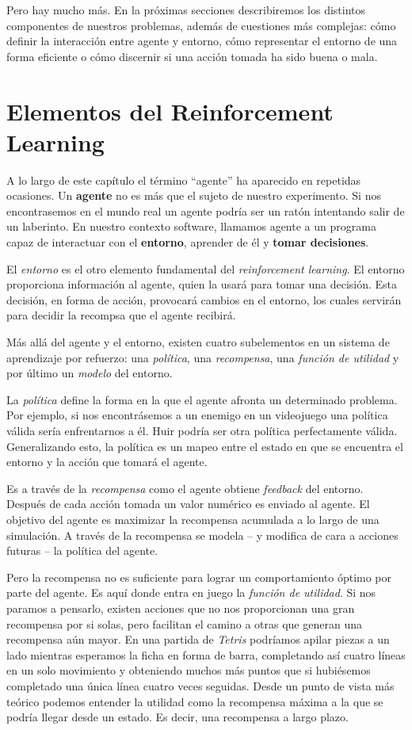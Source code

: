 Pero hay mucho más. En la próximas secciones describiremos los distintos componentes de nuestros problemas, además de cuestiones más complejas: cómo definir la interacción entre agente y entorno, cómo representar el entorno de una forma eficiente o cómo discernir si una acción tomada ha sido buena o mala.

\section{Elementos del Reinforcement Learning}
A lo largo de este capítulo el término ``agente'' ha aparecido en repetidas ocasiones. Un \textbf{agente} no es más que el sujeto de nuestro experimento. Si nos encontrasemos en el mundo real un agente podría ser un ratón intentando salir de un laberinto. En nuestro contexto software, llamamos agente a un programa capaz de interactuar con el \textbf{entorno}, aprender de él y \textbf{tomar decisiones}.

El \textit{entorno} es el otro elemento fundamental del \textit{reinforcement learning}. El entorno proporciona información al agente, quien la usará para tomar una decisión. Esta decisión, en forma de acción, provocará cambios en el entorno, los cuales servirán para decidir la recompsa que el agente recibirá.

Más allá del agente y el entorno, existen cuatro subelementos en un sistema de aprendizaje por refuerzo: una \textit{política}, una \textit{recompensa}, una \textit{función de utilidad} y por último un \textit{modelo} del entorno.

La \textit{política} define la forma en la que el agente afronta un determinado problema. Por ejemplo, si nos encontrásemos a un enemigo en un videojuego una política válida sería enfrentarnos a él. Huir podría ser otra política perfectamente válida. Generalizando esto, la política es un mapeo entre el estado en que se encuentra el entorno y la acción que tomará el agente.

Es a través de la \textit{recompensa} como el agente obtiene \textit{feedback} del entorno. Después de cada acción tomada un valor numérico es enviado al agente. El objetivo del agente es maximizar la recompensa acumulada a lo largo de una simulación. A través de la recompensa se modela – y modifica de cara a acciones futuras – la política del agente.

Pero la recompensa no es suficiente para lograr un comportamiento óptimo por parte del agente. Es aquí donde entra en juego la \textit{función de utilidad}. Si nos paramos a pensarlo, existen acciones que no nos proporcionan una gran recompensa por si solas, pero facilitan el camino a otras que generan una recompensa aún mayor. En una partida de \textit{Tetris} podríamos apilar piezas a un lado mientras esperamos la ficha en forma de barra, completando así cuatro líneas en un solo movimiento y obteniendo muchos más puntos que si hubiésemos completado una única línea cuatro veces seguidas. Desde un punto de vista más teórico podemos entender la utilidad como la recompensa máxima a la que se podría llegar desde un estado. Es decir, una recompensa a largo plazo.

